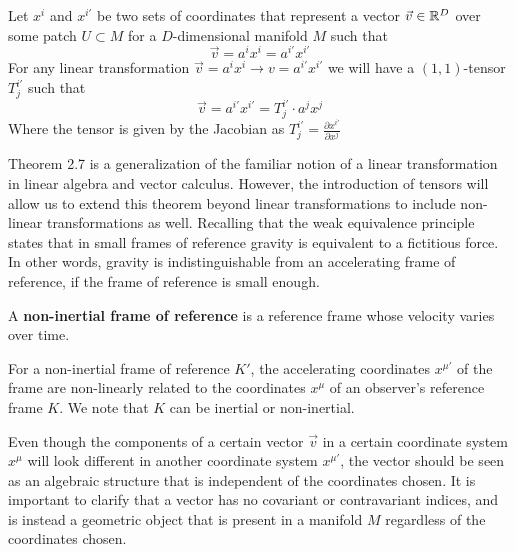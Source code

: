 \documentclass{article}
\begin{document}
 		\begin{thm}
 			Let $x^i$ and $x^{i'}$ be two sets of coordinates that represent a vector $\vec{v} \in \mathbb{R}^D$ over some patch $U\subset M$ for a $D$-dimensional manifold $M$ such that
 			$$ \vec{v} = a^i x^i = a^{i'} x^{i'}$$
 			For any linear transformation $\vec{v} = a^i x^i \to v = a^{i'} x^{i'}$ we will have a $(1,1)$-tensor $T_j^{i'}$ such that
 			$$ \vec{v} = a^{i'} x^{i'} = T_j^{i'}\cdot a^j x^j$$
 			Where the tensor is given by the Jacobian as $T_j^{i'} = \frac{\partial x^{i'}}{\partial x^j}$
 		\end{thm} \noindent
 		Theorem 2.7 is a generalization of the familiar notion of a linear transformation in linear algebra and vector calculus. However, the introduction of tensors will allow us to extend this theorem beyond linear transformations to include non-linear transformations as well. Recalling that the weak equivalence principle states that in small frames of reference gravity is equivalent to a fictitious force. In other words, gravity is indistinguishable from an accelerating frame of reference, if the frame of reference is small enough.
 		\begin{defn}
 			A \textbf{non-inertial frame of reference} is a reference frame whose velocity varies over time.
 		\end{defn}
 		\begin{thm}
 			For a non-inertial frame of reference $K'$, the accelerating coordinates $x^{\mu'}$ of the frame are non-linearly related to the coordinates $x^\mu$ of an observer's reference frame $K$. We note that $K$ can be inertial or non-inertial.
 		\end{thm}
 		Even though the components of a certain vector $\vec{v}$ in a certain coordinate system $x^\mu$ will look different in another coordinate system $x^{\mu'}$, the vector should be seen as an algebraic structure that is independent of the coordinates chosen. It is important to clarify that a vector has no covariant or contravariant indices, and is instead a geometric object that is present in a manifold $M$ regardless of the coordinates chosen.
\end{document}

